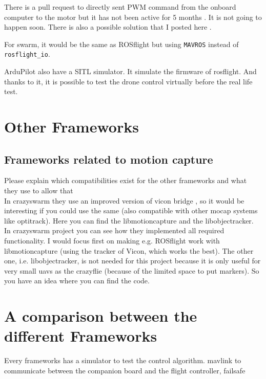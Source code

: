         There is a pull request to directly sent PWM command from the onboard computer to the motor but it has not been active for 5 months \cite{github_px4_10863}. It is not going to happen soon.
        There is also a possible solution that I posted here \cite{px4_low_level_control}.
        
        
        
        For swarm, it would be the same as ROSflight but using \texttt{MAVROS} instead of \texttt{rosflight\_io}.
        
        ArduPilot also have a SITL simulator. It simulate the firmware of rosflight. And thanks to it, it is possible to test the drone control virtually before the real life test.
    
    
    \section{Other Frameworks}
        \subsection{Frameworks related to motion capture}
            {\color{red}Please explain which compatibilities exist for the other frameworks and what they use to allow that \\}
            {\color{red}In crazyswarm they use an improved version of vicon bridge \cite{ros_wiki_vicon_bridge}, so it would be interesting if you could use the same (also compatible with other mocap systems like optitrack). Here \cite{github_usc_actlab} you can find the libmotioncapture and the libobjectracker. In crazyswarm project you can see how they implemented all required functionality. I would focus first on making e.g. ROSflight work with libmotioncapture (using the tracker of Vicon, which works the best). The other one, i.e. libobjectracker, is not needed for this project because it is only useful for very small uavs as the crazyflie (because of the limited space to put markers). So you have an idea where you can find the code.\\}
            
    \section{A comparison between the different Frameworks}
        Every frameworks has a simulator to test the control algorithm.
        mavlink to communicate between the companion board and the flight controller, failsafe
        
